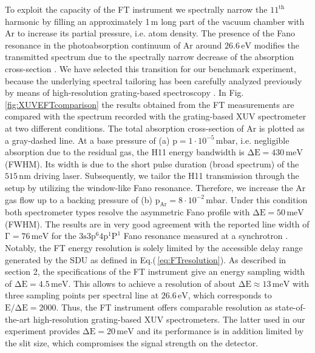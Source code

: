 \documentclass[fleqn,10pt]{wlscirep}
\begin{document}
To exploit the capacity of the FT instrument we spectrally narrow the $\mathrm{11^{th}}$ harmonic by filling an approximately 1\,m long part of the vacuum chamber with Ar to increase its partial pressure, i.e. atom density. The presence of the Fano resonance in the photoabsorption continuum of Ar around $\mathrm{26.6\,eV}$ modifies the transmitted spectrum due to the spectrally narrow decrease of the absorption cross-section \cite{Madden1969}. We have selected this transition for our benchmark experiment, because the underlying spectral tailoring has been carefully analyzed previously by means of high-resolution grating-based spectroscopy \cite{Rothhardt2014a}. In Fig.\,\ref{fig:XUVEFTcomparison} the results obtained from the FT measurements are compared with the spectrum recorded with the grating-based XUV spectrometer at two different conditions. The total absorption cross-section of Ar is plotted as a gray-dashed line. At a base pressure of (a) $\mathrm{p=1\cdot10^{-5}\,mbar}$, i.e. negligible absorption due to the residual gas, the H11 energy bandwidth is $\mathrm{\Delta E = 430\,meV}$ (FWHM). Its width is due to the short pulse duration (broad spectrum) of the $\mathrm{515\,nm}$ driving laser. Subsequently, we tailor the H11 transmission through the setup by utilizing the window-like Fano resonance. Therefore, we increase the Ar gas flow up to a backing pressure of (b) $\mathrm{p_{Ar}=8\cdot10^{-2}\,mbar}$. Under this condition both spectrometer types resolve the asymmetric Fano profile with $\mathrm{\Delta E = 50\,meV}$ (FWHM). The results are in very good agreement with the reported line width of $\mathrm{\Gamma=76\,meV}$ for the $\mathrm{3s3p^{6}4p^{1}P^{1}}$ Fano resonance measured at a synchrotron \cite{Sorensen1994}. Notably, the FT energy resolution is solely limited by the accessible delay range generated by the SDU as defined in Eq.(\,\ref{eq:FTresolution}). As described in section 2, the specifications of the FT instrument give an energy sampling width of $\mathrm{\Delta E = 4.5\,meV}$. This allows to achieve a resolution of about $\mathrm{\Delta E\approx 13\,meV}$ with three sampling points per spectral line at $\mathrm{26.6\,eV}$, which corresponds to $\mathrm{E/\Delta E}=2000$. Thus, the FT instrument offers comparable resolution as state-of-the-art high-resolution grating-based XUV spectrometers. The latter used in our experiment provides $\mathrm{\Delta E = 20\,meV}$ \cite{Hilbert2020} and its performance is in addition limited by the slit size, which compromises the signal strength on the detector.\\
\end{document}
